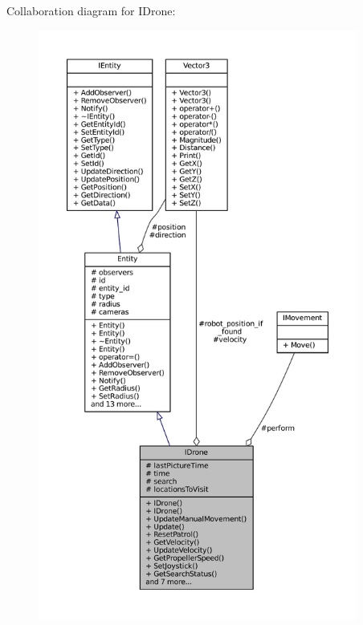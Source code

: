 Collaboration diagram for I\+Drone\+:\nopagebreak
\begin{figure}[H]
\begin{center}
\leavevmode
\includegraphics[height=550pt]{classIDrone__coll__graph}
\end{center}
\end{figure}
